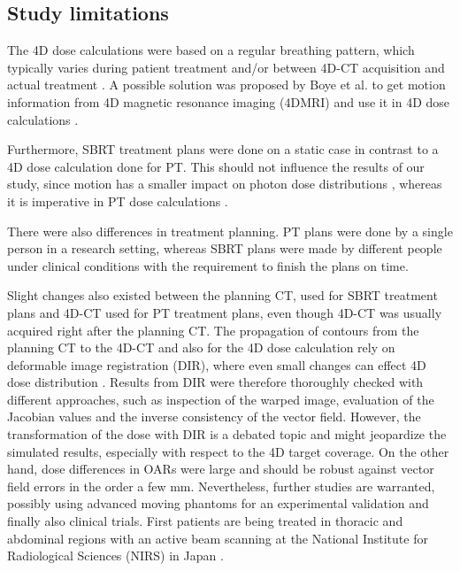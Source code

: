 \documentclass[type=dr, dr=rernat, acm$^3$entcolor=tud7b,colorbacktitle, bigchapter, openright, twoside, 12pt ]{tudthesis}
\begin{document}
\subsection{Study limitations}


The 4D dose calculations were based on a regular breathing pattern, which typically varies during patient treatment and/or between 4D-CT acquisition and actual treatment \cite{Verma2010, Malinowski2011}. 
A possible solution was proposed by Boye et al. to get motion information from 4D magnetic resonance imaging (4DMRI) and use it in 4D dose calculations \cite{Boye2013}.

Furthermore, SBRT treatment plans were done on a static case in contrast to a 4D dose calculation done for PT. This should not influence the results of our study, 
since motion has a smaller impact on photon dose distributions \cite{Zou2014}, whereas it is imperative in PT dose calculations \cite{Bert2011}. 

There were also differences in treatment planning. PT plans were done by a single person in a research setting, whereas SBRT plans were made by different people under clinical conditions with the requirement to finish the plans on time. 

Slight changes also existed between the planning CT, used for SBRT treatment plans and 4D-CT used for PT treatment plans, even though 4D-CT was usually acquired right after the planning CT. 
The propagation of contours from the planning CT to the 4D-CT and also for the 4D dose calculation rely on deformable image registration (DIR), where even small changes can effect 4D dose distribution \cite{Kashani2008}. 
Results from DIR were therefore thoroughly checked with different approaches, such as inspection of the warped image, evaluation of the Jacobian values and the inverse consistency of the vector field. 
However, the transformation of the dose with DIR is a debated topic and might jeopardize the simulated results, especially with respect to the 4D target coverage. On the other hand, dose differences 
in OARs were large and should be robust against vector field errors in the order a few mm. Nevertheless, further studies are warranted, possibly using advanced moving phantoms for an experimental 
validation \cite{Perrin2014} and finally also clinical trials. First patients are being treated in thoracic and abdominal regions with an active beam scanning at the National Institute for Radiological Sciences (NIRS) in Japan \cite{Mori2016}.
\end{document}
